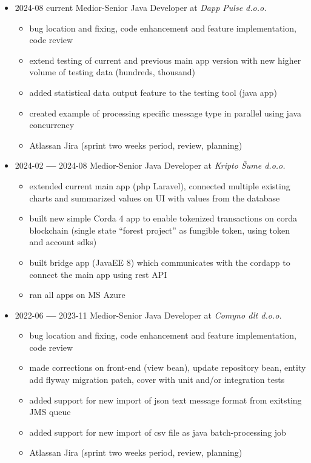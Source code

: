 \documentclass[12pt]{article}
\begin{document}
\begin{itemize}
    \setlength\itemsep{-0.3em}
    \item 2024-08 current Medior-Senior Java Developer at \textit{Dapp Pulse d.o.o.}
        \begin{itemize}
            \setlength\itemsep{-0.3em}
            \item bug location and fixing, code enhancement and feature implementation, code review
            \item extend testing of current and previous main app version with new higher volume of testing data (hundreds, thousand)
            \item added statistical data output feature to the testing tool (java app)
            \item created example of processing specific message type in parallel using java concurrency
            \item Atlassan Jira (sprint two weeks period, review, planning)
        \end{itemize}
    \item 2024-02 \textbf{---} 2024-08 Medior-Senior Java Developer at \textit{Kripto Šume d.o.o.}
        \begin{itemize}
            \setlength\itemsep{-0.3em}
            \item extended current main app (php Laravel), connected multiple existing charts and summarized values on UI with values from the database
            \item built new simple Corda 4 app to enable tokenized transactions on corda blockchain (single state “forest project” as fungible token, using token and account sdks)
            \item built bridge app (JavaEE 8) which communicates with the cordapp to connect the main app using rest API
            \item ran all apps on MS Azure
        \end{itemize}
    \item 2022-06 \textbf{---} 2023-11 Medior-Senior Java Developer at \textit{Comyno dlt d.o.o.}
        \begin{itemize}
            \setlength\itemsep{-0.3em}
            \item bug location and fixing, code enhancement and feature implementation, code review
            \item made corrections on front-end (view bean), update repository bean, entity add flyway migration patch, cover with unit and/or integration tests 
            \item added support for new import of json text message format from exitsting JMS queue 
            \item added support for new import of csv file as java batch-processing job
            \item Atlassan Jira (sprint two weeks period, review, planning)
        \end{itemize}


\end{itemize}
\end{document}
